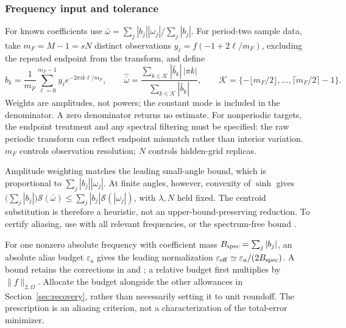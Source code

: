 \subsubsection{Frequency input and tolerance}
For known coefficients use
$\bar\omega=\sum_j|b_j||\omega_j|/\sum_j|b_j|$.
For period-two sample data, take $m_F=M-1=sN$ distinct observations
$y_\ell=f(-1+2\ell/m_F)$, excluding the repeated endpoint from the transform,
and define
\begin{equation}
 \widehat b_k=\frac1{m_F}\sum_{\ell=0}^{m_F-1}
      y_\ell e^{-2\pi i k\ell/m_F},\qquad
 \widehat{\bar\omega}
 =\frac{\sum_{k\in\mathcal K}|\widehat b_k|\,|\pi k|}
        {\sum_{k\in\mathcal K}|\widehat b_k|},\qquad
 \mathcal K=\{-\lfloor m_F/2\rfloor,\ldots,\lceil m_F/2\rceil-1\}.
 \label{eq:bandwidth-frequency-estimate}
\end{equation}
Weights are amplitudes, not powers; the constant mode is included in the
denominator. A zero denominator returns no estimate. For nonperiodic targets,
the endpoint treatment and any spectral filtering must be specified: the raw
periodic transform can reflect endpoint mismatch rather than interior
variation. $m_F$ controls observation resolution; $N$ controls hidden-grid replicas.

Amplitude weighting matches the leading small-angle bound, which is
proportional to $\sum_j|b_j||\omega_j|$. At finite angles, however, convexity
of $\sinh$ gives
$\bigl(\sum_j|b_j|\bigr)\mathcal S(\bar\omega)
 \le\sum_j|b_j|\mathcal S(|\omega_j|)$,
with $\lambda,N$ held fixed. The centroid substitution is therefore a
heuristic, not an upper-bound-preserving reduction. To certify aliasing, use
 with all relevant frequencies, or the
spectrum-free bound .

For one nonzero absolute frequency with coefficient mass
$B_{\rm spec}=\sum_j|b_j|$, an absolute alias budget $\varepsilon_a$ gives
the leading normalization $\varepsilon_{\rm eff}\simeq
\varepsilon_a/(2B_{\rm spec})$. A bound retains the corrections in
 and
; a relative budget first multiplies by
$\|f\|_{2,\Omega}$. Allocate the budget alongside the other allowances in
Section~\ref{sec:recovery}, rather than necessarily setting it to unit
roundoff. The prescription is an aliasing criterion, not a characterization
of the total-error minimizer.

